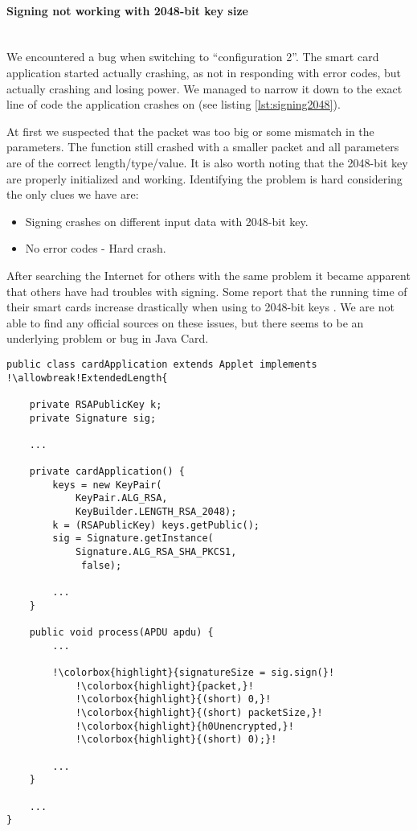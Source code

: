 \paragraph{Signing not working with 2048-bit key size}\mbox{}\\
We encountered a bug when switching to ``configuration 2''. The smart card application started actually crashing, as not in responding with error codes, but actually crashing and losing power. We managed to narrow it down to the exact line of code the application crashes on (see listing \ref{lst:signing2048}).

At first we suspected that the packet was too big or some mismatch in the parameters. The function still crashed with a smaller packet and all parameters are of the correct length/type/value. It is also worth noting that the 2048-bit key are properly initialized and working. Identifying the problem is hard considering the only clues we have are:

\begin{itemize}
    \item Signing crashes on different input data with 2048-bit key.
    \item No error codes - Hard crash.
\end{itemize}

After searching the Internet for others with the same problem it became apparent that others have had troubles with signing. Some report that the running time of their smart cards increase drastically when using to 2048-bit keys \cite{signingtrouble2}. We are not able to find any official sources on these issues, but there seems to be an underlying problem or bug in Java Card.

\begin{lstlisting}[caption=Java Card failed signing., label=lst:signing2048, escapechar=!]
public class cardApplication extends Applet implements !\allowbreak!ExtendedLength{

    private RSAPublicKey k;
    private Signature sig;

    ...

    private cardApplication() {
        keys = new KeyPair(
            KeyPair.ALG_RSA,
            KeyBuilder.LENGTH_RSA_2048);
        k = (RSAPublicKey) keys.getPublic();
    	sig = Signature.getInstance(
            Signature.ALG_RSA_SHA_PKCS1,
             false);

        ...
    }

    public void process(APDU apdu) {
    	...

        !\colorbox{highlight}{signatureSize = sig.sign(}!
            !\colorbox{highlight}{packet,}!
            !\colorbox{highlight}{(short) 0,}!
            !\colorbox{highlight}{(short) packetSize,}!
            !\colorbox{highlight}{h0Unencrypted,}!
            !\colorbox{highlight}{(short) 0);}!

        ...
    }

    ...
}
\end{lstlisting}

